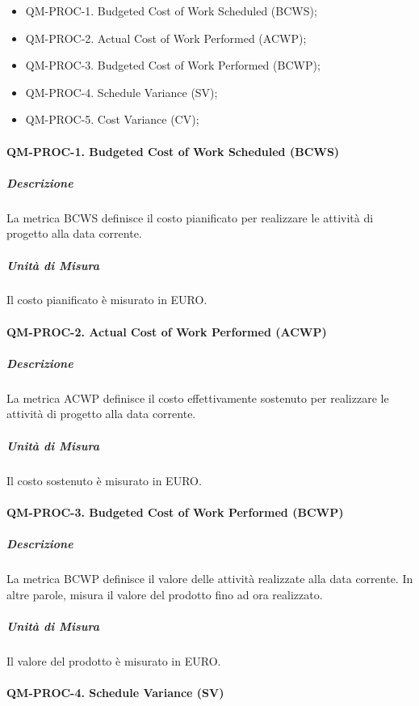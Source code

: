 		\begin{itemize}
			\item QM-PROC-1. Budgeted Cost of Work Scheduled (BCWS);
			\item QM-PROC-2. Actual Cost of Work Performed (ACWP);
			\item QM-PROC-3. Budgeted Cost of Work Performed (BCWP);
			\item QM-PROC-4. Schedule Variance (SV);
			\item QM-PROC-5. Cost Variance (CV);
		\end{itemize}

		\paragraph{QM-PROC-1. Budgeted Cost of Work Scheduled (BCWS)}

			\subparagraph{Descrizione}
			La metrica BCWS definisce il costo pianificato per realizzare le attività di progetto alla data corrente. 

			\subparagraph{Unità di Misura}
			Il costo pianificato è misurato in EURO.

		\paragraph{QM-PROC-2. Actual Cost of Work Performed (ACWP)}

			\subparagraph{Descrizione}
			La metrica ACWP definisce il costo effettivamente sostenuto per realizzare le attività di progetto alla data corrente. 

			\subparagraph{Unità di Misura}
			Il costo sostenuto è misurato in EURO.

		\paragraph{QM-PROC-3. Budgeted Cost of Work Performed (BCWP)}

			\subparagraph{Descrizione}
			La metrica BCWP definisce il valore delle attività realizzate alla data corrente. In altre parole, misura il valore del prodotto fino ad ora realizzato.

			\subparagraph{Unità di Misura}
			Il valore del prodotto è misurato in EURO.

		\paragraph{QM-PROC-4. Schedule Variance (SV)}

